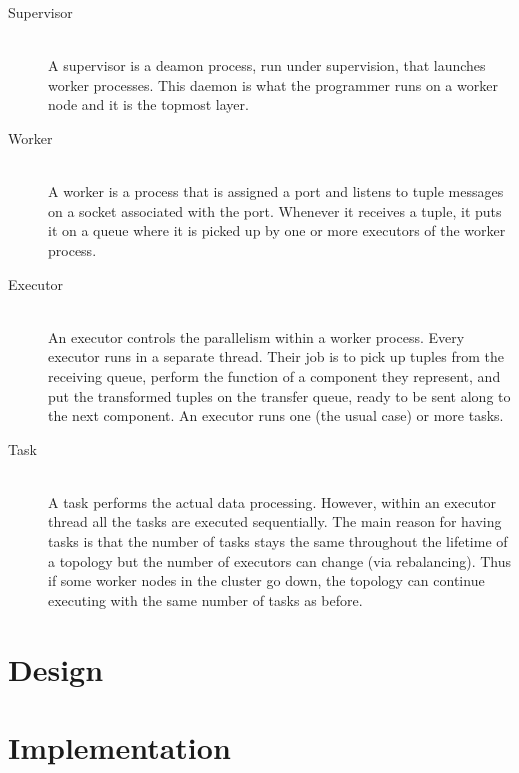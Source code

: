 \documentclass[bsc,logo,frontabs,twoside,singlespacing,normalheadings,parskip]{infthesis}     %
\begin{document}
\begin{description}
	\item[Supervisor] \hfill \\
	A supervisor is a deamon process, run under supervision, that launches worker processes. This daemon is what the programmer runs on a worker node and it is the topmost layer.
	\item[Worker] \hfill \\
	A worker is a process that is assigned a port and listens to tuple messages on a socket associated with the port. Whenever it receives a tuple, it puts it on a queue where it is picked up by one or more executors of the worker process.
	\item[Executor] \hfill \\
	An executor controls the parallelism within a worker process. Every executor runs in a separate thread. Their job is to pick up tuples from the receiving queue, perform the function of a component they represent, and put the transformed tuples on the transfer queue, ready to be sent along to the next component. An executor runs one (the usual case) or more tasks.
	\item[Task] \hfill \\
	A task performs the actual data processing. However, within an executor thread all the tasks are executed sequentially. The main reason for having tasks is that the number of tasks stays the same throughout the lifetime of a topology but the number of executors can change (via rebalancing). Thus if some worker nodes in the cluster go down, the topology can continue executing with the same number of tasks as before.
\end{description}




\chapter{Design}




\chapter{Implementation}


\end{document}
